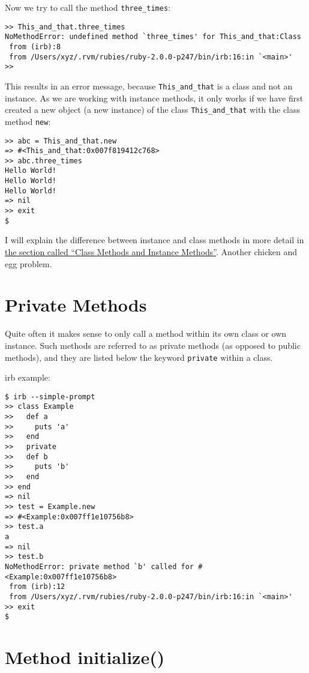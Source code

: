 \documentclass[a4paper]{book}
\newcommand{\chap}[1]{\newpage\thispagestyle{empty}\chapter{#1}\label{chap:\thechapter}}
\begin{document}
Now we try to call the method \texttt{three\_times}:

\begin{shaded}\begin{verbatim}
>> This_and_that.three_times
NoMethodError: undefined method `three_times' for This_and_that:Class
 from (irb):8
 from /Users/xyz/.rvm/rubies/ruby-2.0.0-p247/bin/irb:16:in `<main>'
>>
\end{verbatim}\end{shaded}

This results in an error message, because \texttt{This\_and\_that} is a class and not an instance. As we are working with instance methods, it only works if we have first created a new object (a new instance) of the class \texttt{This\_and\_that} with the class method \texttt{new}:

\begin{shaded}\begin{verbatim}
>> abc = This_and_that.new
=> #<This_and_that:0x007f819412c768>
>> abc.three_times
Hello World!
Hello World!
Hello World!
=> nil
>> exit
$
\end{verbatim}\end{shaded}

I will explain the difference between instance and class methods in more detail in \hyperref[classux5fmethodsux5fvsux5finstanceux5fmethods]{the section called “Class Methods and Instance Methods”}. Another chicken and egg problem.

\chap{Private Methods}\label{private-methods}

Quite often it makes sense to only call a method within its own class or own instance. Such methods are referred to as private methods (as opposed to public methods), and they are listed below the keyword \texttt{private} within a class.

irb example:

\begin{shaded}\begin{verbatim}
$ irb --simple-prompt
>> class Example
>>   def a
>>     puts 'a'
>>   end
>>   private
>>   def b
>>     puts 'b'
>>   end
>> end
=> nil
>> test = Example.new
=> #<Example:0x007ff1e10756b8>
>> test.a
a
=> nil
>> test.b
NoMethodError: private method `b' called for #<Example:0x007ff1e10756b8>
 from (irb):12
 from /Users/xyz/.rvm/rubies/ruby-2.0.0-p247/bin/irb:16:in `<main>'
>> exit
$
\end{verbatim}\end{shaded}

\chap{Method initialize()}\label{method-initialize}
\end{document}
